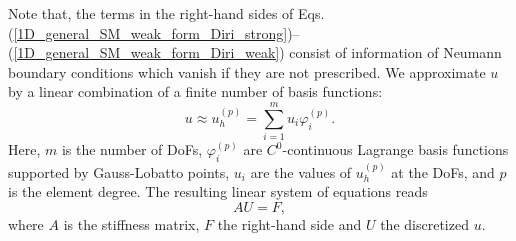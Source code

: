 \documentclass[review,3p]{elsarticle}
\begin{document}
\noindent Note that, the terms in the right-hand sides of Eqs. (\ref{1D_general_SM_weak_form_Diri_strong})--(\ref{1D_general_SM_weak_form_Diri_weak}) consist of information of Neumann boundary conditions which vanish if they are not prescribed. We approximate $u$ by a linear combination of a finite number of basis functions:
\begin{equation}
 u \approx u_h ^{(p)} = \sum _ {i=1} ^{m} u _{i} \varphi _{i}^{(p)}. \label{General_SM_u_approx}%
\end{equation}
Here, $m$ is the number of DoFs, $\varphi _{i}^{(p)}$ are $C^0$-continuous Lagrange basis functions supported by Gauss-Lobatto points, $u_i$ are the values of $u_h^{(p)}$ at the DoFs, and $p$ is the element degree. The resulting linear system of equations reads
\begin{equation}
 A {U} = F,				\label{matrix equation std FEM}
\end{equation}
where $A$ is the stiffness matrix, $F$ the right-hand side and $U$ the discretized $u$.
\end{document}
